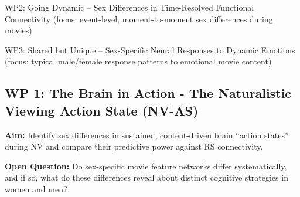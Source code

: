 \documentclass[11pt,a4paper]{article}
\begin{document}
WP2: Going Dynamic – Sex Differences in Time-Resolved Functional Connectivity
(focus: event-level, moment-to-moment sex differences during movies)

WP3: Shared but Unique – Sex-Specific Neural Responses to Dynamic Emotions
(focus: typical male/female response patterns to emotional movie content)

\subsection*{WP 1: The Brain in Action - The Naturalistic Viewing Action State (NV-AS)}

\textbf{Aim:} Identify sex differences in sustained, content-driven brain “action states” during NV 
and compare their predictive power against RS connectivity.

\textbf{Open Question:} Do sex-specific movie feature networks differ systematically, and if so, 
what do these differences reveal about distinct cognitive strategies in women and men?  
\end{document}
